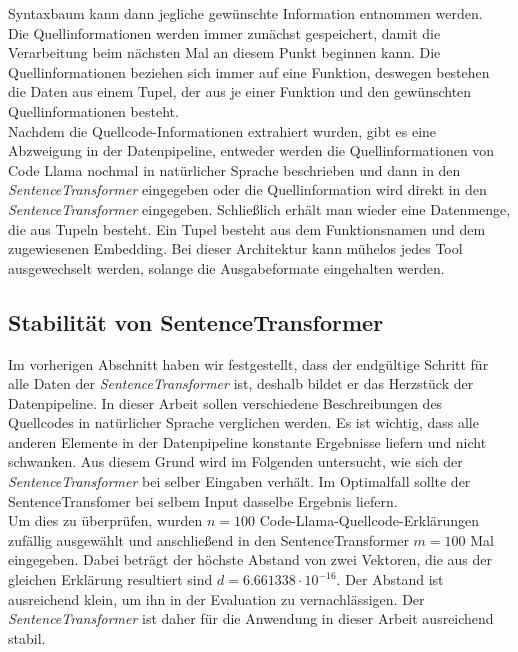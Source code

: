 \documentclass[12pt,letterpaper,ngerman]{article}
\begin{document}
Syntaxbaum kann dann jegliche gewünschte Information entnommen 
werden.\\
Die Quellinformationen werden immer zunächst gespeichert, damit die 
Verarbeitung beim nächsten Mal an diesem Punkt beginnen kann.
Die Quellinformationen beziehen sich immer auf eine Funktion,
deswegen bestehen die Daten aus einem Tupel, der aus je einer
Funktion und den gewünschten Quellinformationen besteht.\\
Nachdem die Quellcode-Informationen extrahiert wurden, 
gibt es eine Abzweigung in der Datenpipeline, entweder 
werden die Quellinformationen von Code Llama nochmal in natürlicher 
Sprache beschrieben und dann in den \textit{SentenceTransformer}
eingegeben oder die Quellinformation wird direkt in den 
\textit{SentenceTransformer} eingegeben. Schließlich erhält man
wieder eine Datenmenge, die aus Tupeln besteht. Ein Tupel besteht
aus dem Funktionsnamen und dem zugewiesenen Embedding. 
Bei dieser Architektur kann mühelos jedes Tool ausgewechselt werden,
solange die Ausgabeformate eingehalten werden. 
\subsection{Stabilität von SentenceTransformer}
Im vorherigen Abschnitt haben wir festgestellt, dass der endgültige
Schritt für alle Daten der \textit{SentenceTransformer} ist, deshalb
bildet 
er das Herzstück der Datenpipeline. In dieser Arbeit sollen 
verschiedene Beschreibungen des Quellcodes in 
natürlicher Sprache verglichen werden. Es ist wichtig, dass alle 
anderen Elemente in der Datenpipeline konstante Ergebnisse 
liefern und nicht schwanken. Aus diesem Grund wird im Folgenden 
untersucht, wie sich der \textit{SentenceTransformer} bei selber
Eingaben verhält. Im Optimalfall sollte der SentenceTransfomer bei 
selbem Input dasselbe Ergebnis liefern.\\
Um dies zu überprüfen, wurden $n = 100$ 
Code-Llama-Quellcode-Erklärungen zufällig ausgewählt und 
anschließend in
den SentenceTransformer $m = 100$ Mal eingegeben. Dabei beträgt
der höchste Abstand von zwei Vektoren,
die aus der gleichen Erklärung resultiert sind 
$d = 6.661338\cdot 10^{-16}$. Der 
Abstand ist ausreichend klein, um ihn in der Evaluation zu 
vernachlässigen. Der \textit{SentenceTransformer} ist daher
für die Anwendung in dieser Arbeit ausreichend stabil.
\end{document}
